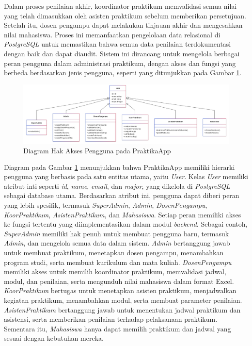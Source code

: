 Dalam proses penilaian akhir, koordinator praktikum memvalidasi semua nilai yang telah dimasukkan oleh asisten praktikum sebelum memberikan persetujuan. Setelah itu, dosen pengampu dapat melakukan tinjauan akhir dan mengesahkan nilai mahasiswa. Proses ini memanfaatkan pengelolaan data relasional di \emph{PostgreSQL} untuk memastikan bahwa semua data penilaian terdokumentasi dengan baik dan dapat diaudit. Sistem ini dirancang untuk mengelola berbagai peran pengguna dalam administrasi praktikum, dengan akses dan fungsi yang berbeda berdasarkan jenis pengguna, seperti yang ditunjukkan pada Gambar \ref{fig:user_roles}.

\begin{figure}[H]
    \centering
    \includegraphics[width=1\textwidth]{gambar/class_diagram.png}
    \caption{Diagram Hak Akses Pengguna pada PraktikaApp}
    \label{fig:user_roles}
\end{figure}

Diagram pada Gambar \ref{fig:user_roles} menunjukkan bahwa PraktikaApp memiliki hierarki pengguna yang berbasis pada satu entitas utama, yaitu \emph{User}. Kelas \emph{User} memiliki atribut inti seperti \emph{id}, \emph{name}, \emph{email}, dan \emph{major}, yang dikelola di \emph{PostgreSQL} sebagai database utama. Berdasarkan atribut ini, pengguna dapat diberi peran yang lebih spesifik, termasuk \emph{SuperAdmin}, \emph{Admin}, \emph{DosenPengampu}, \emph{KoorPraktikum}, \emph{AsistenPraktikum}, dan \emph{Mahasiswa}. Setiap peran memiliki akses ke fungsi tertentu yang diimplementasikan dalam modul \emph{backend}. Sebagai contoh, \emph{SuperAdmin} memiliki hak penuh untuk membuat pengguna baru, termasuk \emph{Admin}, dan mengelola semua data dalam sistem. \emph{Admin} bertanggung jawab untuk membuat praktikum, menetapkan dosen pengampu, menambahkan program studi, serta membuat kurikulum dan mata kuliah. \emph{DosenPengampu} memiliki akses untuk memilih koordinator praktikum, memvalidasi jadwal, modul, dan penilaian, serta mengunduh nilai mahasiswa dalam format Excel. \emph{KoorPraktikum} bertugas untuk menetapkan asisten praktikum, menjadwalkan kegiatan praktikum, menambahkan modul, serta membuat parameter penilaian. \emph{AsistenPraktikum} bertanggung jawab untuk menentukan jadwal praktikum dan asistensi, serta memberikan penilaian terhadap pelaksanaan praktikum. Sementara itu, \emph{Mahasiswa} hanya dapat memilih praktikum dan jadwal yang sesuai dengan kebutuhan mereka.

